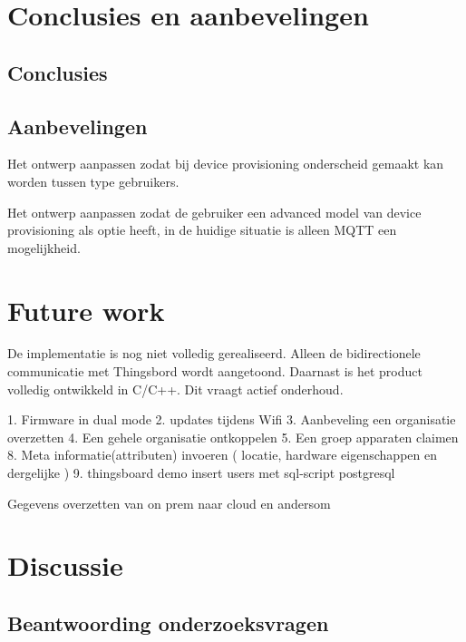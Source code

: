 			
		
		\chapter{Conclusies en aanbevelingen}
		\section{Conclusies}
		
		\section{Aanbevelingen}
		Het ontwerp aanpassen zodat bij device provisioning onderscheid gemaakt kan worden tussen type gebruikers.
		
		
		Het ontwerp aanpassen zodat de gebruiker een advanced model van device provisioning als optie heeft, in de huidige situatie is alleen MQTT een mogelijkheid.
		
		\chapter{Future work}
		
		De implementatie is nog niet volledig gerealiseerd.  Alleen de bidirectionele communicatie met Thingsbord wordt aangetoond.
		Daarnast is het product volledig ontwikkeld in C/C++. Dit vraagt actief onderhoud.
		
		1.	Firmware in dual mode
		2.	updates tijdens Wifi
		3.	Aanbeveling een organisatie overzetten
		4.	Een gehele organisatie ontkoppelen
		5.	Een groep apparaten claimen
		8.	Meta informatie(attributen) invoeren ( locatie, hardware eigenschappen en dergelijke )
		9.	thingsboard demo insert users met sql-script postgresql
		
		Gegevens overzetten van on prem naar cloud en andersom
		
		
		\chapter{Discussie}
		
		
		
		\section{Beantwoording onderzoeksvragen}
		
